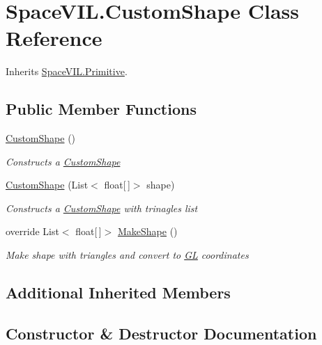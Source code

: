 \hypertarget{class_space_v_i_l_1_1_custom_shape}{}\section{Space\+V\+I\+L.\+Custom\+Shape Class Reference}
\label{class_space_v_i_l_1_1_custom_shape}


Inherits \mbox{\hyperlink{class_space_v_i_l_1_1_primitive}{Space\+V\+I\+L.\+Primitive}}.

\subsection*{Public Member Functions}
\begin{DoxyCompactItemize}
\item 
\mbox{\hyperlink{class_space_v_i_l_1_1_custom_shape_ab67f8e1e17f268ca2e24f516f762323e}{Custom\+Shape}} ()
\begin{DoxyCompactList}\small\item\em Constructs a \mbox{\hyperlink{class_space_v_i_l_1_1_custom_shape}{Custom\+Shape}} \end{DoxyCompactList}\item 
\mbox{\hyperlink{class_space_v_i_l_1_1_custom_shape_ad5b5ff7c5f594e7b7fcde384b8cb6d0b}{Custom\+Shape}} (List$<$ float\mbox{[}$\,$\mbox{]}$>$ shape)
\begin{DoxyCompactList}\small\item\em Constructs a \mbox{\hyperlink{class_space_v_i_l_1_1_custom_shape}{Custom\+Shape}} with trinagles list \end{DoxyCompactList}\item 
override List$<$ float\mbox{[}$\,$\mbox{]}$>$ \mbox{\hyperlink{class_space_v_i_l_1_1_custom_shape_aa8a1eb76ab361eea35540787f79fac6f}{Make\+Shape}} ()
\begin{DoxyCompactList}\small\item\em Make shape with triangles and convert to \mbox{\hyperlink{namespace_g_l}{GL}} coordinates \end{DoxyCompactList}\end{DoxyCompactItemize}
\subsection*{Additional Inherited Members}


\subsection{Constructor \& Destructor Documentation}
\mbox{\label{class_space_v_i_l_1_1_custom_shape_ab67f8e1e17f268ca2e24f516f762323e}} 
